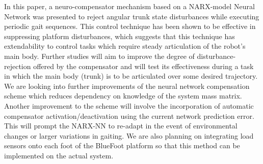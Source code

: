 
In this paper, a neuro-compensator mechanism based on a NARX-model Neural Network was presented to reject angular trunk state disturbances while executing periodic gait sequences. This control technique has been shown to be effective in suppressing platform disturbances, which suggests that this technique has extendability to control tasks which require steady articulation of the robot's main body. Further studies will aim to improve the degree of disturbance-rejection offered by the compensator and will test its effectiveness during a task in which the main body (trunk) is to be articulated over some desired trajectory. We are looking into further improvements of the neural network compensation scheme which reduces dependency on knowledge of the system mass matrix. Another improvement to the scheme will involve the incorporation of automatic compensator activation/deactivation using the current network prediction error. This will prompt the  NARX-NN to re-adapt in the event of environmental changes or larger variations in gaiting. We are also planning on integrating load sensors onto each foot of the BlueFoot platform so that this method can be implemented on the actual system.
